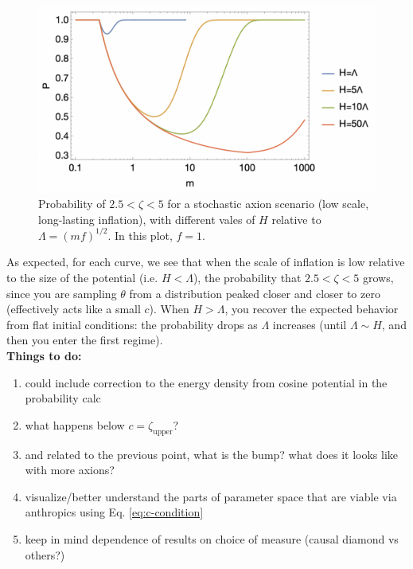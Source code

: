 \documentclass{article}
\begin{document}
\begin{figure}[h]
    \centering
    \includegraphics[width=1\linewidth]{figs/low-scale-inf-prob.jpeg}
    \caption{Probability of $2.5<\zeta<5$ for a stochastic axion scenario (low scale, long-lasting inflation), with different vales of $H$ relative to $\Lambda = (mf)^{1/2}$. In this plot, $f=1$.}
    \label{fig:low-scale-inf-prob}
\end{figure}

As expected, for each curve, we see that when the scale of inflation is low relative to the size of the potential (i.e. $H<\Lambda$), the probability that $2.5<\zeta<5$ grows, since you are sampling $\theta$ from a distribution peaked closer and closer to zero (effectively acts like a small $c$). When $H>\Lambda$, you recover the expected behavior from flat initial conditions: the probability drops as $\Lambda$ increases (until $\Lambda \sim H$, and then you enter the first regime). \\

\color{red}\noindent \textbf{Things to do:}
\begin{enumerate}
    \item could include correction to the energy density from cosine potential in the probability calc
    \item what happens below $c=\zeta_\text{upper}$?
    \item and related to the previous point, what is the bump? what does it looks like with more axions?
    \item visualize/better understand the parts of parameter space that are viable via anthropics using Eq. \eqref{eq:c-condition}
    \item keep in mind dependence of results on choice of measure (causal diamond vs others?)
\end{enumerate}\color{black}
\end{document}
